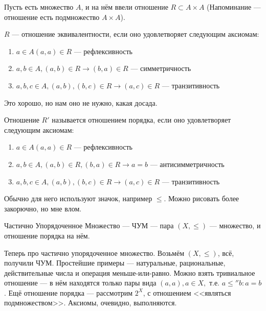 
\begin{definition}
Пусть есть множество $A$, и на нём  ввели отношение $R \subset A \times A$ (Напоминание --- отношение есть подмножество $A \times A$).

$R$ --- отношение эквивалентности, если оно удовлетворяет следующим аксиомам:

\begin{enumerate}
\item{$a \in A (a, a) \in R$} --- рефлексивность
\item{$a, b \in A, (a, b) \in R \to (b, a) \in R$} --- симметричность
\item{$a, b, c \in A, (a, b), (b, c) \in R \to (a, c) \in R$ --- транзитивность}
\end{enumerate}
\end{definition}

Это хорошо, но нам оно не нужно, какая досада.

\begin{definition}

	Отношение $R'$ называется отношением порядка, если оно удовлетворяет следующим аксиомам:

\begin{enumerate}
\item{$a \in A (a, a) \in R$} --- рефлексивность
\item{$a, b \in A, (a, b) \in R, (b, a) \in R \to a = b$} --- антисимметричность
\item{$a, b, c \in A, (a, b), (b, c) \in R \to (a, c) \in R$ --- транзитивность}
\end{enumerate}
\end{definition}

Обычно для него используют значок, например $\le$. Можно рисовать более закорючно, но мне влом.

\begin{definition}
	Частично Упорядоченное Множество --- ЧУМ --- пара $(X, \le)$ --- множество, и отношение порядка на нём.
\end{definition}

Теперь про частично упорядоченное множество. Возьмём  $(X, \le)$, всё, получили ЧУМ. Простейшие примеры --- натуральные, рациональные, действительные числа и операция меньше-или-равно. Можно взять тривиальное отношение --- в нём находятся только пары вида $(a, a), a \in X, $ т.е. $a \le'' b : a = b$. Ещё отношение порядка --- рассмотрим $2^X$, с отношением <<являться подмножеством>>. Аксиомы, очевидно, выполняются. 

